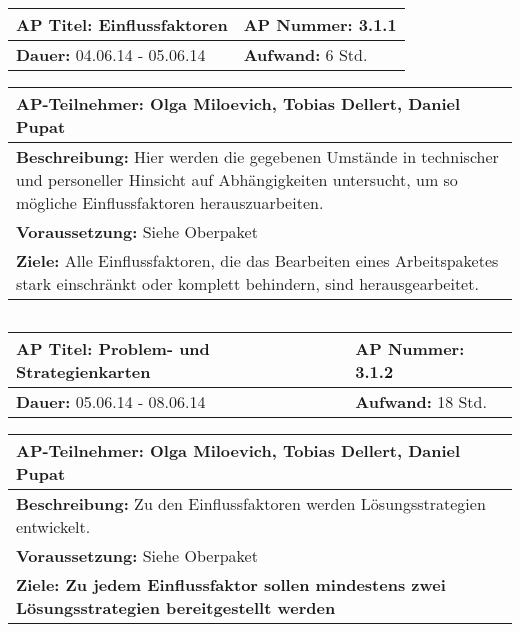 \begin{tabular}{|p{7.43cm}|p{7.43cm}|}
\hline
\textbf{AP Titel: }Einflussfaktoren & \textbf{AP Nummer: }3.1.1\\ 
\hline
\textbf{Dauer: }04.06.14 - 05.06.14& \textbf{Aufwand: }6 Std.\\
\hline
\end{tabular}
\begin{tabular}{|p{15.3cm}|}
\hline
\textbf{AP-Teilnehmer: }Olga Miloevich, Tobias Dellert, Daniel Pupat\\
\hline
\textbf{Beschreibung: }Hier werden die gegebenen Umstände in technischer und personeller Hinsicht auf Abhängigkeiten untersucht, um so mögliche Einflussfaktoren herauszuarbeiten.\\
\hline
\textbf{Voraussetzung: }Siehe Oberpaket\\
\hline 
\textbf{Ziele: }Alle Einflussfaktoren, die das Bearbeiten eines Arbeitspaketes stark einschränkt oder komplett behindern, sind herausgearbeitet.  \\
\hline 
\end{tabular}
\begin{verbatim}

\end{verbatim}

\begin{tabular}{|p{7.43cm}|p{7.43cm}|}
\hline
\textbf{AP Titel: }Problem- und Strategienkarten & \textbf{AP Nummer: }3.1.2\\ 
\hline
\textbf{Dauer: }05.06.14 - 08.06.14& \textbf{Aufwand: }18 Std.\\
\hline
\end{tabular}
\begin{tabular}{|p{15.3cm}|}
\hline
\textbf{AP-Teilnehmer: }Olga Miloevich, Tobias Dellert, Daniel Pupat\\
\hline
\textbf{Beschreibung: }Zu den Einflussfaktoren werden Lösungsstrategien entwickelt. \\
\hline
\textbf{Voraussetzung: }Siehe Oberpaket\\
\hline 
\textbf{Ziele: Zu jedem Einflussfaktor sollen mindestens zwei Lösungsstrategien bereitgestellt werden}\\
\hline 
\end{tabular}
\begin{verbatim}

\end{verbatim}

